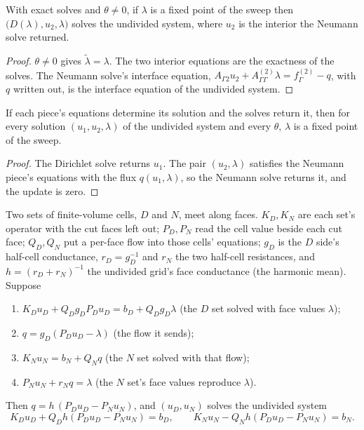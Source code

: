 \begin{theorem}\label{thm:T3b}
  \leanok
  With exact solves and $\theta\ne0$, if $\lambda$ is a fixed point of the
  sweep then $\bigl(D(\lambda),u_2,\lambda\bigr)$ solves the undivided system,
  where $u_2$ is the interior the Neumann solve returned.
\end{theorem}

\begin{proof}
  \leanok
  $\theta\ne0$ gives $\tilde\lambda=\lambda$.  The two interior equations are
  the exactness of the solves.  The Neumann solve's interface equation,
  $A_{\Gamma2}u_2+A^{(2)}_{\Gamma\Gamma}\lambda=f^{(2)}_\Gamma-q$, with $q$
  written out, is the interface equation of the undivided system.
\end{proof}

\begin{theorem}[T3b, converse]\label{thm:T3b-converse}
  \leanok
  If each piece's equations determine its solution and the solves return it,
  then for every solution $(u_1,u_2,\lambda)$ of the undivided system and every
  $\theta$, $\lambda$ is a fixed point of the sweep.
\end{theorem}

\begin{proof}
  \leanok
  The Dirichlet solve returns $u_1$.  The pair $(u_2,\lambda)$ satisfies the
  Neumann piece's equations with the flux $q(u_1,\lambda)$, so the Neumann solve
  returns it, and the update is zero.
\end{proof}

\begin{theorem}\label{thm:T3b-face}
  \leanok
  Two sets of finite-volume cells, $D$ and $N$, meet along faces.  $K_D,K_N$ are
  each set's operator with the cut faces left out; $P_D,P_N$ read the cell value
  beside each cut face; $Q_D,Q_N$ put a per-face flow into those cells'
  equations; $g_D$ is the $D$ side's half-cell conductance, $r_D=g_D^{-1}$ and
  $r_N$ the two half-cell resistances, and $h=(r_D+r_N)^{-1}$ the undivided
  grid's face conductance (the harmonic mean).  Suppose
  \begin{enumerate}
    \item $K_Du_D+Q_Dg_DP_Du_D=b_D+Q_Dg_D\lambda$ (the $D$ set solved with face
      values $\lambda$);
    \item $q=g_D(P_Du_D-\lambda)$ (the flow it sends);
    \item $K_Nu_N=b_N+Q_Nq$ (the $N$ set solved with that flow);
    \item $P_Nu_N+r_Nq=\lambda$ (the $N$ set's face values reproduce
      $\lambda$).
  \end{enumerate}
  Then $q=h\,(P_Du_D-P_Nu_N)$, and $(u_D,u_N)$ solves the undivided system
  \[
    K_Du_D+Q_Dh(P_Du_D-P_Nu_N)=b_D,\qquad
    K_Nu_N-Q_Nh(P_Du_D-P_Nu_N)=b_N .
  \]
\end{theorem}

